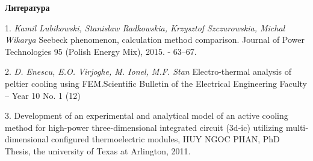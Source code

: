 \smallskip \centerline{\bf Литература}\nopagebreak

1. {\it Kamil Lubikowski, Stanislaw Radkowskia, Krzysztof
\linebreak
Szczurowskia, Michal Wikarya}
\foreignlanguage{english}{
	Seebeck phenomenon, calculation method comparison. Journal of Power Technologies 95 (Polish Energy Mix), 2015. - 63–67.
}

2. \foreignlanguage{english}{
	{\it D. Enescu, E.O. Virjoghe, M. Ionel, M.F. Stan} Electro-thermal analysis of peltier cooling using FEM.Scientific Bulletin of the Electrical Engineering Faculty – Year 10 No. 1 (12)
}

3. \foreignlanguage{english}{
	Development of an experimental and analytical model of an active cooling method for high-power three-dimensional integrated circuit (3d-ic) utilizing multidimensional configured thermoelectric modules, HUY NGOC PHAN, PhD Thesis, the university of Texas at Arlington, 2011.
}
